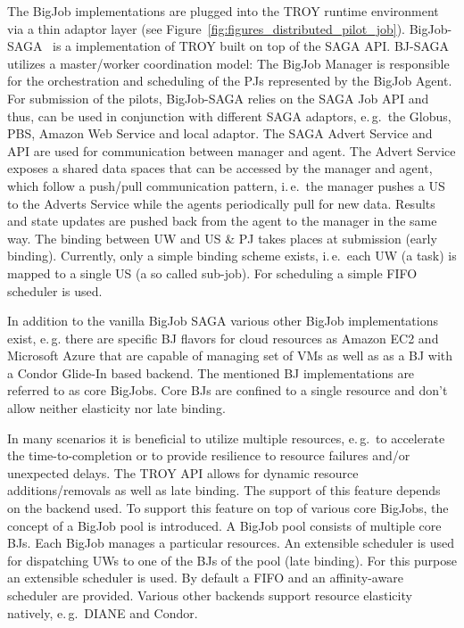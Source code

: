 \documentclass[conference,final]{IEEEtran}
\begin{document}
	


The BigJob implementations are plugged into the TROY runtime environment via a
thin adaptor layer (see Figure~\ref{fig:figures_distributed_pilot_job}).
BigJob-SAGA~\cite{saga_bigjob_condor_cloud} is a implementation of TROY built on
top of the SAGA API. BJ-SAGA utilizes a master/worker coordination model:
The BigJob Manager is responsible for the orchestration and scheduling of the
PJs represented by the BigJob Agent. For submission of the pilots, BigJob-SAGA
relies on the SAGA Job API and thus, can be used in conjunction with different
SAGA adaptors, e.\,g.\ the Globus, PBS, Amazon Web Service and local adaptor.
The SAGA Advert Service and API are used for communication between manager and
agent. The Advert Service exposes a shared data spaces that can be accessed by
the manager and agent, which follow a push/pull communication pattern, i.\,e.\
the manager pushes a US to the Adverts Service while the agents periodically
pull for new data. Results and state updates are pushed back from the agent to
the manager in the same way. The binding between UW and US \& PJ takes places at
submission (early binding). Currently, only a simple binding scheme exists,
i.\,e.\ each UW (a task) is mapped to a single US (a so called sub-job). For
scheduling a simple FIFO scheduler is used.

In addition to the vanilla BigJob SAGA various other BigJob
implementations exist, e.\,g. there are specific BJ flavors for cloud
resources as Amazon EC2 and Microsoft Azure that are capable of
managing set of VMs as well as as a BJ with a Condor Glide-In based
backend. The mentioned BJ implementations are referred to as core
BigJobs. Core BJs are confined to a single resource and don't allow
neither elasticity nor late binding.


In many scenarios it is beneficial to utilize multiple resources, e.\,g.\ to
accelerate the time-to-completion or to provide resilience to resource failures
and/or unexpected delays. The TROY API allows for dynamic resource
additions/removals as well as late binding. The support of this feature
depends on the backend used. To support this feature on top of various core
BigJobs, the concept of a BigJob pool is introduced. A BigJob pool consists of
multiple core BJs. Each BigJob manages a particular resources. An extensible
scheduler is used for dispatching UWs to one of the BJs of the pool (late
binding). For this purpose an extensible scheduler is used. By default a FIFO
and an affinity-aware scheduler are provided. Various other backends support
resource elasticity natively, e.\,g.\ DIANE and Condor. 
\end{document}
